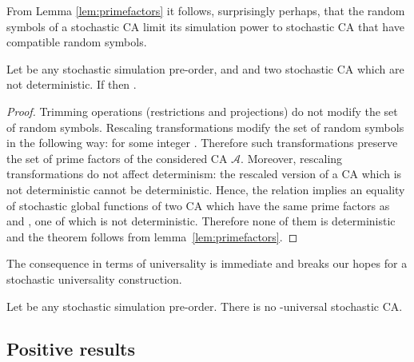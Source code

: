 \documentclass[submission]{fundam}
\newcommand\DELETE[1]{}
\newcommand{\AUTO}[1]{{\ensuremath{\mathcal{#1}}}}
\newcommand\CAA{\AUTO A}
\begin{document}
{From Lemma \ref{lem:primefactors} it follows, surprisingly perhaps, that the random symbols of a stochastic CA limit its simulation power to stochastic CA that have compatible random symbols.
\begin{theorem}\label{thm:primefactors}
  Let  be any stochastic simulation pre-order, and  and  two stochastic CA which are not deterministic. If  then .
\end{theorem}
\begin{proof} Trimming operations (restrictions and projections) do not modify the set of random symbols. Rescaling transformations modify the set of random symbols in the following way:  for some integer . Therefore such transformations preserve the set of prime factors  of the considered CA \CAA. Moreover, rescaling transformations do not affect determinism: the rescaled version of a CA which is not deterministic cannot be deterministic. Hence, the relation  implies an equality of stochastic global functions of two CA which have the same prime factors as  and , one of which is not deterministic. Therefore none of them is deterministic and the theorem follows from lemma~\ref{lem:primefactors}.
\end{proof}
\DELETE{\begin{proof}(Sketch) First  is invariant under any rescaling transformation. Then, if the distribution matches, there must be coupling of the random strings of some  finite lenght by Theorem~\ref{thm:coupling}. The existence of such a coupling implies that  and  must have a common prime factor. 
\end{proof}}
\DELETE{Given any stochastic pre-order , a -universal CA cannot be deterministic because determinism is preserved by simulation (Fact~\ref{fact:ideals}). Moreover, for any prime~ there is some  with . Hence Theorem~\ref{thm:primefactors},}

The consequence in terms of universality is immediate and breaks our hopes for a stochastic universality construction. 
\begin{corollary} \label{cor:no:stoc:universal}
  Let  be any stochastic simulation pre-order. There is no \mbox{-universal} stochastic CA.
\end{corollary}

\subsection{Positive results}


}
\end{document}
